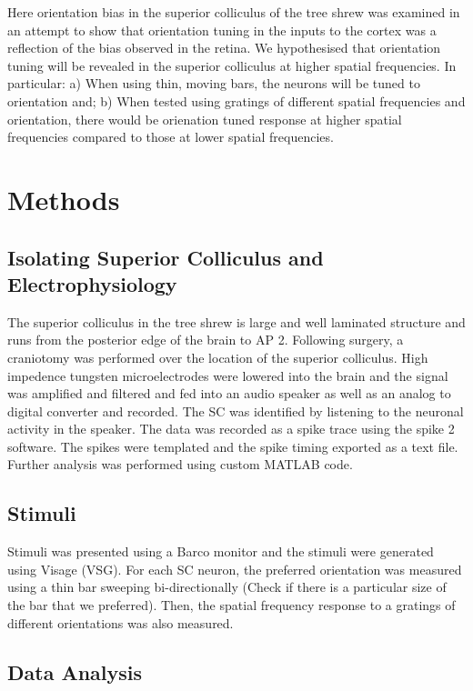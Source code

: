 	Here orientation bias in the superior colliculus of the tree shrew was examined in an attempt to show that orientation tuning in the inputs to the cortex was a reflection of the bias observed in the retina. We hypothesised that orientation tuning will be revealed in the superior colliculus at higher spatial frequencies. In particular:
	a) When using thin, moving bars, the neurons will be tuned to orientation and;
	b) When tested using gratings of different spatial frequencies and orientation, there would be orienation tuned response at higher spatial frequencies compared to those at lower spatial frequencies.


	

\section{Methods}
	\subsection{Isolating Superior Colliculus and Electrophysiology}
		The superior colliculus in the tree shrew is large and well laminated structure and runs from the posterior edge of the brain to AP 2. Following surgery, a craniotomy was performed over the location of the superior colliculus. High impedence tungsten microelectrodes were lowered into the brain and the signal was amplified and filtered and fed into an audio speaker as well as an analog to digital converter and recorded. The SC was identified by listening to the neuronal activity in the speaker. The data was recorded as a spike trace using the spike 2 software. The spikes were templated and the spike timing exported as a text file. Further analysis was performed using custom MATLAB code.
		
	\subsection{Stimuli}
	
		Stimuli was presented using a Barco monitor and the stimuli were generated using Visage (VSG). For each SC neuron, the preferred orientation was measured using a thin bar sweeping bi-directionally (Check if there is a particular size of the bar that we preferred). Then, the spatial frequency response to a gratings of different orientations was also measured.
		
	\subsection{Data Analysis}
		
